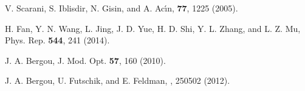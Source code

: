 \documentclass[aps,prl,twocolumn,showpacs]{revtex4}
\begin{document}
\begin{thebibliography}{99}
 V. Scarani, S. Iblisdir, N. Gisin, and A. Ac\'{\i}n, \rmp \textbf{77}, 1225 (2005).

 H. Fan, Y. N. Wang, L. Jing, J. D. Yue, H. D. Shi, Y. L. Zhang, and L. Z. Mu, Phys. Rep. {\bf 544}, 241 (2014).

%
%


 J. A. Bergou, J. Mod. Opt. {\bf 57}, 160 (2010).



 J. A. Bergou, U. Futschik, and E. Feldman, , 250502 (2012).


\end{thebibliography}     
\end{document}
